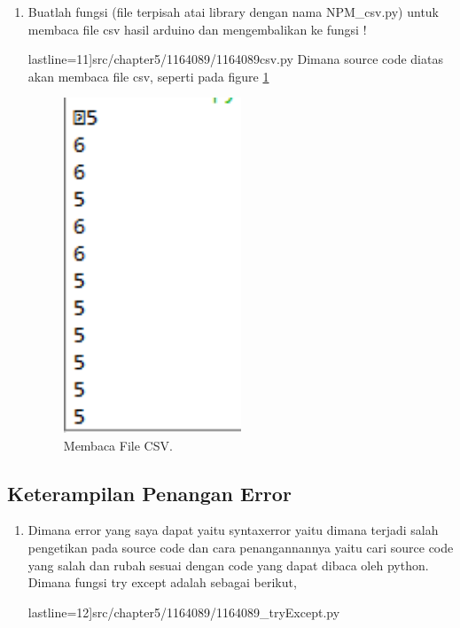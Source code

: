 \begin{enumerate}
\item Buatlah fungsi (file terpisah atai library dengan nama NPM\_csv.py) untuk membaca file csv hasil arduino dan mengembalikan ke fungsi !

	 lastline=11]{src/chapter5/1164089/1164089csv.py}
	\subitem Dimana source code diatas akan membaca file csv, seperti pada figure \ref{YNC5-12}

	\begin{figure}[!htbp]
		\centerline{\includegraphics[width=0.5\textwidth]{figures/chapter5/1164089/YNC5-12.png}}
		\caption{Membaca File CSV.}
		\label{YNC5-12}
	\end{figure} 

\end{enumerate}

\subsection{Keterampilan Penangan Error}
\begin{enumerate}

	\item Dimana error yang saya dapat yaitu syntaxerror yaitu dimana terjadi salah pengetikan pada source code dan cara penangannannya yaitu cari source code yang salah dan rubah sesuai dengan code yang dapat dibaca oleh python. Dimana fungsi try except adalah sebagai berikut,

	 lastline=12]{src/chapter5/1164089/1164089_tryExcept.py}
	
\end{enumerate}
